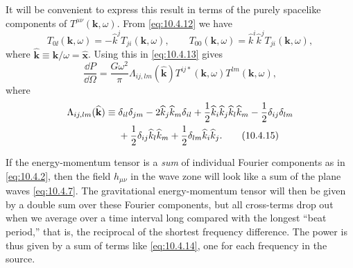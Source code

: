 It will be convenient to express this result in terms of the purely spacelike
components of \(T^{\mu\nu}(\mathbf{k},\omega)\). From
\eqref{eq:10.4.12} we have
\[
  T_{0\ii}(\mathbf{k},\omega)
  =-\widehat k^jT_{ji}(\mathbf{k},\omega),
  \qquad
  T_{00}(\mathbf{k},\omega)
  =\widehat k^i\widehat k^jT_{ji}(\mathbf{k},\omega),
\]
where
\(\widehat{\mathbf{k}}\equiv\mathbf{k}/\omega
=\widehat{\mathbf{x}}\). Using this in \eqref{eq:10.4.13} gives
\begin{equation}
  \frac{\dd P}{\dd\Omega}
  =
  \frac{G\omega^2}{\pi}
  \Lambda_{ij,lm}(\widehat{\mathbf{k}})
  T^{ij*}(\mathbf{k},\omega)T^{lm}(\mathbf{k},\omega),
  \tag{10.4.14}\label{eq:10.4.14}
\end{equation}
where
\begin{align}
  \Lambda_{ij,lm}(\widehat{\mathbf{k}})
  \equiv{}&
  \delta_{il}\delta_{jm}
  -2\widehat k_j\widehat k_m\delta_{il}
  +\frac12\widehat k_i\widehat k_j\widehat k_l\widehat k_m
  -\frac12\delta_{ij}\delta_{lm}
  \notag\\
  &+\frac12\delta_{ij}\widehat k_l\widehat k_m
  +\frac12\delta_{lm}\widehat k_i\widehat k_j.
  \tag{10.4.15}\label{eq:10.4.15}
\end{align}

If the energy-momentum tensor is a \emph{sum} of individual Fourier
components as in \eqref{eq:10.4.2}, then the field \(h_{\mu\nu}\) in the
wave zone will look like a sum of the plane waves \eqref{eq:10.4.7}. The
gravitational energy-momentum tensor will then be given by a double sum over
these Fourier components, but all cross-terms drop out when we average over a
time interval long compared with the longest ``beat period,'' that is, the
reciprocal of the shortest frequency difference. The power is thus given by
a sum of terms like \eqref{eq:10.4.14}, one for each frequency in the
source.

